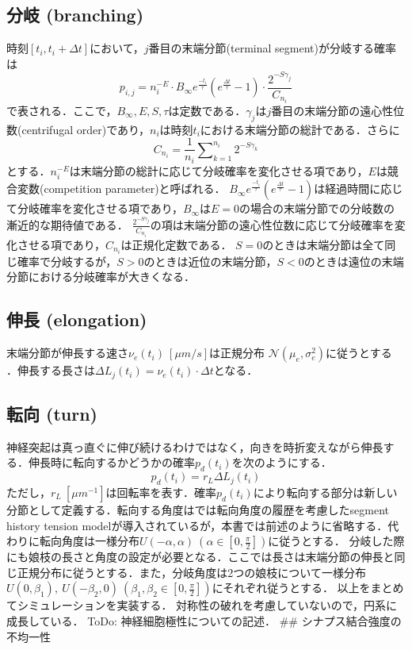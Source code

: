 \subsection{分岐 (branching)}
時刻$[t_i, t_i + \Delta t]$において，$j$番目の末端分節(terminal segment)が分岐する確率は
\begin{equation}
p_{i,j} = n_i^{-E}\cdot B_{\infty} e^{\frac{-t_i}{\tau}} \left(e^{\frac{\Delta t}{\tau}} - 1\right)\cdot \frac{2^{-S\gamma_j}}{C_{n_i}}
\end{equation}
で表される．ここで，$B_{\infty}, E, S, \tau$は定数である．$\gamma_j$は$j$番目の末端分節の遠心性位数(centrifugal order)であり，$n_i$は時刻$t_i$における末端分節の総計である．さらに
\begin{equation}
{C_{n_i}} = \frac{1}{n_i}\sum\nolimits_{k = 1}^{n_i} {{2^{ - S{\gamma_k}}}}
\end{equation}
とする．$n_i^{-E}$は末端分節の総計に応じて分岐確率を変化させる項であり，$E$は競合変数(competition parameter)と呼ばれる．
$B_{\infty} e^{\frac{-t_i}{\tau}} \left(e^{\frac{\Delta t}{\tau}} - 1\right)$は経過時間に応じて分岐確率を変化させる項であり，$B_{\infty}$は$E=0$の場合の末端分節での分岐数の漸近的な期待値である．
$\frac{2^{-S\gamma_j}}{C_{n_i}}$の項は末端分節の遠心性位数に応じて分岐確率を変化させる項であり，$C_{n_i}$は正規化定数である．
$S=0$のときは末端分節は全て同じ確率で分岐するが，$S>0$のときは近位の末端分節，$S<0$のときは遠位の末端分節における分岐確率が大きくなる．
\subsection{伸長 (elongation) }
末端分節が伸長する速さ$\nu_e(t_i)\ [\mu m/s]$は正規分布 $\mathcal{N}(\mu_e, \sigma_e^2)$に従うとする \citep{Van_Ooyen2014-fb}．伸長する長さは$\Delta L_j(t_i)=\nu_e(t_i) \cdot \Delta t$となる．
\subsection{転向 (turn)}
神経突起は真っ直ぐに伸び続けるわけではなく，向きを時折変えながら伸長する．伸長時に転向するかどうかの確率$p_d(t_i)$を次のようにする．
\begin{equation}
p_d(t_i) = r_L\Delta L_j(t_i)
\end{equation}
ただし，$r_L\ [\mu m^{-1}]$は回転率を表す．確率$p_d(t_i)$により転向する部分は新しい分節として定義する．転向する角度は\citep{Koene2009-hv}では転向角度の履歴を考慮したsegment history tension modelが導入されているが，本書では前述のように省略する．代わりに転向角度は一様分布$U(-\alpha, \alpha)\ \left(\alpha\in \left[0, \frac{\pi}{2}\right]\right)$に従うとする．
分岐した際にも娘枝の長さと角度の設定が必要となる．ここでは長さは末端分節の伸長と同じ正規分布に従うとする．また，分岐角度は2つの娘枝について一様分布$U(0, \beta_1),\ U(-\beta_2, 0)\ \left(\beta_1, \beta_2\in \left[0, \frac{\pi}{2}\right]\right)$にそれぞれ従うとする．
以上をまとめてシミュレーションを実装する．
対称性の破れを考慮していないので，円系に成長している．
ToDo: 神経細胞極性についての記述．
## シナプス結合強度の不均一性

